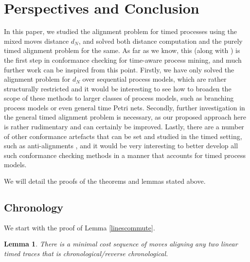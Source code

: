 \documentclass[conference]{IEEEtran}
\newtheorem*{lemma*}{Lemma}
\begin{document}
\section{Perspectives and Conclusion}
In this paper, we studied the alignment problem for timed processes using the mixed moves distance $d_N$, and solved both distance computation and the purely timed alignment problem for the same. As far as we know, this (along with \cite{CR22}) is the first step in conformance checking for time-aware process mining, and much further work can be inspired from this point. Firstly, we have only solved the alignment problem for $d_N$ over sequential process models, which are rather structurally restricted and it would be interesting to see how to broaden the scope of these methods to larger classes of process models, such as branching process models or even general time Petri nets. Secondly, further investigation in the general timed alignment problem is necessary, as our proposed approach here is rather rudimentary and can certainly be improved. Lastly, there are a number of other conformance artefacts that can be set and studied in the timed setting, such as anti-alignments \cite{CBC21}, and it would be very interesting to better develop all such conformance checking methods in a manner that accounts for timed process models.



\clearpage
\appendix
We will detail the proofs of the theorems and lemmas stated above. 

\subsection{Chronology}
We start with the proof of Lemma \ref{linescommute}. 

\begin{lemma*}There is a minimal cost sequence of moves aligning any two linear timed traces that is chronological/reverse chronological. 
\end{lemma*}
\end{document}
